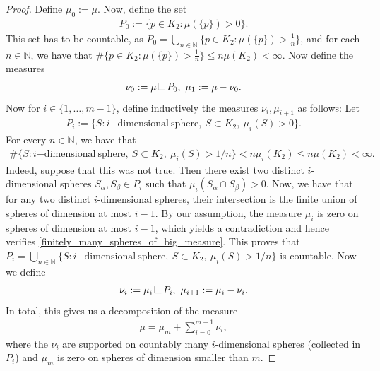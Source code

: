 \documentclass[a4paper,10pt]{article}
\numberwithin{equation}{section}
\newcommand{\N}{\mathbb{N}}
\newcommand{\LM}[1]{\hbox{\vrule width.2pt \vbox to#1pt{\vfill \hrule
width#1pt height.2pt}}}
\newcommand{\LL}{{\mathchoice
{\,\LM7\,}{\,\LM7\,}{\,\LM5\,}{\,\LM{3.35}\,}}}
\begin{document}
\begin{proof}
    Define $\mu_0:= \mu$. 
    Now, define the set 
    \begin{align*}
        P_0:= \{p \in K_2: \mu(\{p\})>0\}. 
    \end{align*}
    This set has to be countable, as $P_0 = \bigcup_{n \in \N} \{p \in K_2: \mu(\{p\})>\frac{1}{n}\}$, and for each $n\in \N$, we have that $\#\{p \in K_2: \mu(\{p\})>\frac{1}{n}\}\leq n\mu(K_2) <\infty$. 
    Now define the measures
    \begin{align}
        \nu_0:= \mu \LL P_0,\ \mu_1:= \mu-\nu_0.  
    \end{align}
    Now for $i \in \{1, \ldots, m-1\}$, define inductively the measures $\nu_i, \mu_{i+1}$ as follows:
    Let
    \begin{align}
        P_i:=\{S:  i\mathrm{-dimensional\ sphere}, \ S \subset K_2,\ \mu_i(S)>0\}. 
    \end{align}
    For every $n \in \N$, we have that 
    \begin{align}\label{finitely_many_spheres_of_big_measure}
       \#\{S:  i\mathrm{-dimensional\ sphere}, \ S \subset K_2,\ \mu_i(S)>1/n\} < n\mu_{i}(K_2) \leq n \mu(K_2) < \infty.
    \end{align}
    Indeed, suppose that this was not true. Then there exist two distinct $i$-dimensional spheres $S_\alpha, S_\beta \in P_i$ such that $\mu_{i}( S_\alpha \cap S_\beta) >0$. 
    Now, we have that for any two distinct $i$-dimensional spheres, their intersection is the finite union of spheres of dimension at most $i-1$. By our assumption, the measure $\mu_{i}$ is zero on spheres of dimension at most $i-1$, which yields a contradiction and hence verifies \eqref{finitely_many_spheres_of_big_measure}.
    This proves that $P_i = \bigcup_{n \in \N} \{S:  i\mathrm{-dimensional\ sphere}, \ S \subset K_2,\ \mu_i(S)>1/n\}$ is countable. 
    Now we define 
    \begin{align}
        \nu_i:= \mu_i \LL P_i,\ \mu_{i+1}:= \mu_i-\nu_{i}. 
    \end{align}
    In total, this gives us a decomposition of the measure 
    \begin{align}
        \mu = \mu_m + \sum_{i=0}^{m-1} \nu_{i},
    \end{align}
    where the $\nu_i$ are supported on countably many $i$-dimensional spheres (collected in $P_i$) and $\mu_m$ is zero on spheres of dimension smaller than $m$. 


\end{proof}
\end{document}
